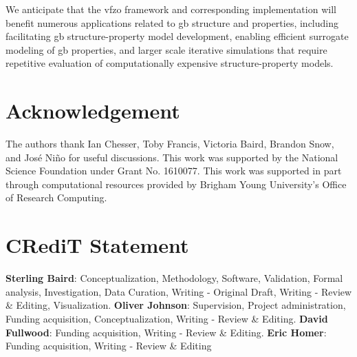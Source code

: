 \documentclass[final,twocolumn,12pt]{elsarticle}
\begin{document}
We anticipate that the \gls{vfzo} framework and corresponding implementation will benefit numerous applications related to \gls{gb} structure and properties, including facilitating \gls{gb} structure-property model development, enabling efficient surrogate modeling of \gls{gb} properties, and larger scale iterative simulations that require repetitive evaluation of computationally expensive structure-property models.

\section*{Acknowledgement}
\label{sec:acknowledgement}

The authors thank Ian Chesser, Toby Francis, Victoria Baird, Brandon Snow, and José Niño for useful discussions. This work was supported by the National Science Foundation under Grant No. 1610077. This work was supported in part through computational resources provided by Brigham Young University's Office of Research Computing.

\section*{CRediT Statement}
\textbf{Sterling Baird}: Conceptualization, Methodology, Software, Validation, Formal analysis, Investigation, Data Curation, Writing - Original Draft, Writing - Review \& Editing, Visualization. \textbf{Oliver Johnson}: Supervision, Project administration, Funding acquisition, Conceptualization, Writing - Review \& Editing. \textbf{David Fullwood}: Funding acquisition, Writing - Review \& Editing. \textbf{Eric Homer}: Funding acquisition, Writing - Review \& Editing

% 
\end{document}
